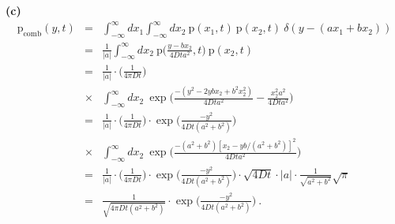 \textbf{(c)} 
\begin{eqnarray}
\text{p}_\text{comb}(y, t) &=& \int_{-\infty}^{\infty} dx_1  \int_{-\infty}^{\infty} dx_2 ~ \text{p}(x_1, t)~\text{p}(x_2, t)~\delta(y - (a x_1 + b x_2)) \nonumber \\
&=& \frac{1}{|a|}\int_{-\infty}^{\infty} dx_2 ~ \text{p}\bigg(\frac{y-b x_2}{4 D t a^2}, t\bigg)~\text{p}(x_2, t) \nonumber \\
&=&  \frac{1}{|a|} \cdot \bigg(\frac{1}{4 \pi D t}\bigg) \nonumber \\
&\times& \int_{-\infty}^{\infty} dx_2 ~ \exp\bigg( \frac{-(y^2 - 2 y b x_2 + b^2 x_2^2)}{4 D t a^2} - \frac{x_2^2 a^2}{4 D t a^2}
\bigg) \nonumber \\
&=& \frac{1}{|a|} \cdot \bigg(\frac{1}{4 \pi D t}\bigg) \cdot \exp\bigg( \frac{-y^2}{4 D t (a^2 + b^2)}\bigg) \nonumber \\
&\times& \int_{-\infty}^{\infty} dx_2 ~ \exp\bigg( \frac{-(a^2 + b^2) [x_2 - y b /(a^2 +b^2)]^2}{4 D t a^2} \bigg) \nonumber \\
&=& \frac{1}{|a|} \cdot \bigg(\frac{1}{4 \pi D t}\bigg)  \cdot \exp\bigg( \frac{-y^2}{4 D t (a^2 + b^2)}\bigg) \cdot \sqrt{4 D t} \cdot |a| \cdot \frac{1}{\sqrt{a^2 + b^2}} \sqrt{\pi} \nonumber \\
&=& \boxed{\frac{1}{\sqrt{4 \pi D t (a^2 + b^2)}} \cdot \exp\bigg( \frac{-y^2}{4 D t (a^2 + b^2)}\bigg)}~.
\end{eqnarray}
